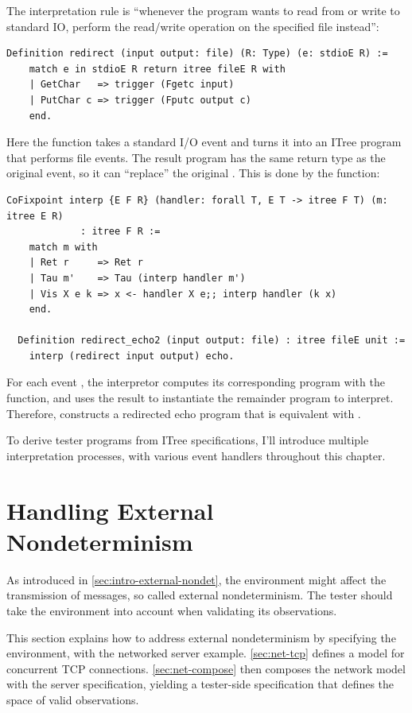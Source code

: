 The interpretation rule is ``whenever the program wants to read from or write to
standard IO, perform the read/write operation on the specified file instead'':
\begin{lstlisting}[style=customcoq]
  Definition redirect (input output: file) (R: Type) (e: stdioE R) :=
    match e in stdioE R return itree fileE R with
    | GetChar   => trigger (Fgetc input)
    | PutChar c => trigger (Fputc output c)
    end.
\end{lstlisting}

Here the  function takes a standard I/O event and turns it into an
ITree program that performs file events.  The result program has the same return
type as the original event, so it can ``replace'' the original .
This is done by the  function:
\begin{lstlisting}[style=customcoq]
  CoFixpoint interp {E F R} (handler: forall T, E T -> itree F T) (m: itree E R)
             : itree F R :=
    match m with
    | Ret r     => Ret r
    | Tau m'    => Tau (interp handler m')
    | Vis X e k => x <- handler X e;; interp handler (k x)
    end.

  Definition redirect_echo2 (input output: file) : itree fileE unit :=
    interp (redirect input output) echo.
\end{lstlisting}

For each event , the interpretor computes its corresponding
program with the  function, and uses the result  to
instantiate the remainder program to interpret.  Therefore, 
constructs a redirected echo program that is equivalent with
.

To derive tester programs from ITree specifications, I'll introduce multiple
interpretation processes, with various event handlers throughout this chapter.

\section{Handling External Nondeterminism}
\label{sec:external-nondet}
As introduced in \autoref{sec:intro-external-nondet}, the environment might
affect the transmission of messages, so called external nondeterminism.  The
tester should take the environment into account when validating its
observations.

This section explains how to address external nondeterminism by specifying the
environment, with the networked server example.  \autoref{sec:net-tcp} defines a
model for concurrent TCP connections.  \autoref{sec:net-compose} then composes
the network model with the server specification, yielding a tester-side
specification that defines the space of valid observations.

